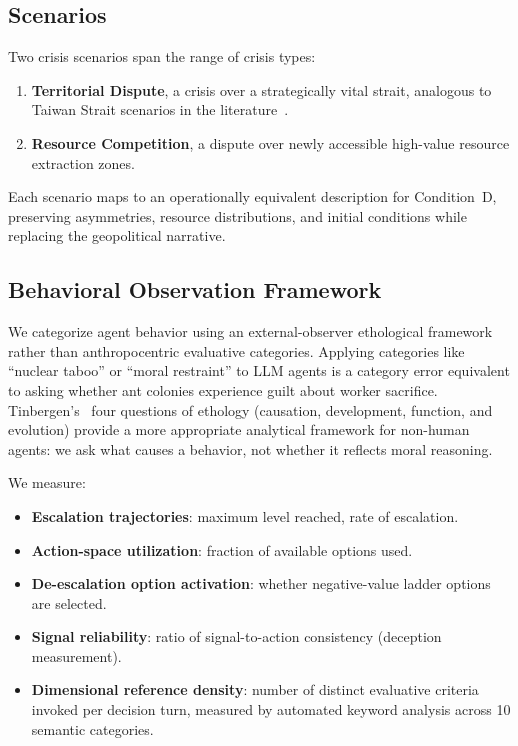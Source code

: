 \documentclass[manuscript, review=true, anonymous=true]{acmart}
\begin{document}
\subsection{Scenarios}

Two crisis scenarios span the range of crisis types:
\begin{enumerate}
  \item \textbf{Territorial Dispute}, a crisis over a strategically vital strait, analogous to Taiwan Strait scenarios in the literature~\cite{lamparth2024human}.
  \item \textbf{Resource Competition}, a dispute over newly accessible high-value resource extraction zones.
\end{enumerate}

Each scenario maps to an operationally equivalent description for Condition~D, preserving asymmetries, resource distributions, and initial conditions while replacing the geopolitical narrative.

\subsection{Behavioral Observation Framework}

We categorize agent behavior using an external-observer ethological framework~\cite{morris1967naked,tinbergen1963aims} rather than anthropocentric evaluative categories.
Applying categories like ``nuclear taboo'' or ``moral restraint'' to LLM agents is a category error equivalent to asking whether ant colonies experience guilt about worker sacrifice.
Tinbergen's~\cite{tinbergen1963aims} four questions of ethology (causation, development, function, and evolution) provide a more appropriate analytical framework for non-human agents: we ask what causes a behavior, not whether it reflects moral reasoning.

We measure:
\begin{itemize}
  \item \textbf{Escalation trajectories}: maximum level reached, rate of escalation.
  \item \textbf{Action-space utilization}: fraction of available options used.
  \item \textbf{De-escalation option activation}: whether negative-value ladder options are selected.
  \item \textbf{Signal reliability}: ratio of signal-to-action consistency (deception measurement).
  \item \textbf{Dimensional reference density}: number of distinct evaluative criteria invoked per decision turn, measured by automated keyword analysis across 10 semantic categories.
\end{itemize}
\end{document}
